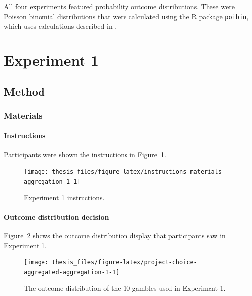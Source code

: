 \documentclass[a4paper, nobind, dvipsnames]{templates/ociamthesis}
\theoremstyle{definition}
\theoremstyle{definition}
\theoremstyle{definition}
\theoremstyle{definition}
\theoremstyle{remark}
\begin{document}
All four experiments featured probability outcome distributions. These were
Poisson binomial distributions that were calculated using the R package
\texttt{poibin}, which uses calculations described in \textcite{hong2013}.

\hypertarget{experiment-1-1}{%
\section{Experiment 1}\label{experiment-1-1}}

\hypertarget{method-6}{%
\subsection{Method}\label{method-6}}

\hypertarget{materials-5}{%
\subsubsection{Materials}\label{materials-5}}

\hypertarget{instructions-materials-aggregation-1-appendix}{%
\paragraph{Instructions}\label{instructions-materials-aggregation-1-appendix}}

Participants were shown the instructions in
Figure~\ref{fig:instructions-materials-aggregation-1}.



\begin{figure}
\texttt{[image: thesis\_files/figure-latex/instructions-materials-aggregation-1-1]} \caption{Experiment 1 instructions.}\label{fig:instructions-materials-aggregation-1}
\end{figure}

\hypertarget{outcome-distribution-materials-aggregation-1-appendix}{%
\paragraph{Outcome distribution decision}\label{outcome-distribution-materials-aggregation-1-appendix}}

Figure~\ref{fig:project-choice-aggregated-aggregation-1} shows the outcome
distribution display that participants saw in Experiment 1.



\begin{figure}
\texttt{[image: thesis\_files/figure-latex/project-choice-aggregated-aggregation-1-1]} \caption{The outcome distribution of the 10 gambles used in Experiment 1.}\label{fig:project-choice-aggregated-aggregation-1}
\end{figure}
\end{document}
